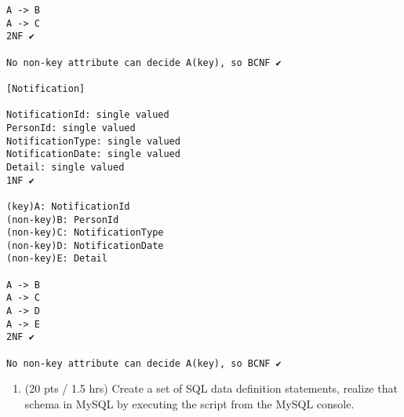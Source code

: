 \documentclass[
]{article}
\providecommand{\tightlist}{%
  \setlength{\itemsep}{0pt}\setlength{\parskip}{0pt}}
\begin{document}
\begin{verbatim}
A -> B
A -> C
2NF ✔️

No non-key attribute can decide A(key), so BCNF ✔️

[Notification]

NotificationId: single valued
PersonId: single valued
NotificationType: single valued
NotificationDate: single valued
Detail: single valued
1NF ✔️

(key)A: NotificationId
(non-key)B: PersonId
(non-key)C: NotificationType
(non-key)D: NotificationDate
(non-key)E: Detail

A -> B
A -> C
A -> D
A -> E
2NF ✔️

No non-key attribute can decide A(key), so BCNF ✔️
\end{verbatim}

\begin{enumerate}
\def\labelenumi{\arabic{enumi}.}
\setcounter{enumi}{4}
\tightlist
\item
  (20 pts / 1.5 hrs) Create a set of SQL data definition statements,
  realize that schema in MySQL by executing the script from the MySQL
  console.
\end{enumerate}
\end{document}
